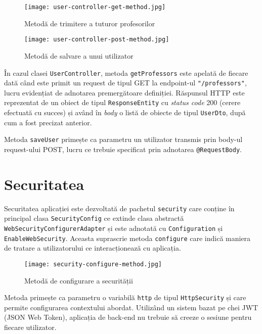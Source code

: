 \begin{figure}[H]
	\centering
	\texttt{[image: user-controller-get-method.jpg]}
	\caption{Metodă de trimitere a tuturor profesorilor}
\end{figure}

\begin{figure}[H]
	\centering
	\texttt{[image: user-controller-post-method.jpg]}
	\caption{Metodă de salvare a unui utilizator}
\end{figure}

În cazul clasei \texttt{UserController}, metoda \texttt{getProfessors} este apelată de fiecare dată când este primit un request de tipul GET la endpoint-ul \texttt{"/professors"}, lucru evidențiat de adnotarea premergătoare definiției. Răspunsul HTTP este reprezentat de un obiect de tipul \texttt{ResponseEntity} cu \textit{status code} 200 (cerere efectuată cu succes) și având în \textit{body} o listă de obiecte de tipul \texttt{UserDto}, după cum a fost precizat anterior.

Metoda \texttt{saveUser} primește ca parametru un utilizator transmis prin body-ul request-ului POST, lucru ce trebuie specificat prin adnotarea \texttt{@RequestBody}.

\section{Securitatea}

Securitatea aplicației este dezvoltată de pachetul \texttt{security} care conține în principal clasa \texttt{SecurityConfig} ce extinde clasa abstractă \texttt{WebSecurityConfigurerAdapter} și este adnotată cu \texttt{Configuration} și \texttt{EnableWebSecurity}. Aceasta suprascrie metoda \texttt{configure} care indică maniera de tratare a utilizatorului ce interacționează cu aplicația.

\begin{figure}[H]
	\centering
	\texttt{[image: security-configure-method.jpg]}
	\caption{Metodă de configurare a securității}
\end{figure}

Metoda primește ca parametru o variabilă \texttt{http} de tipul \texttt{HttpSecurity} și care permite configurarea contextului abordat. Utilizând un sistem bazat pe chei JWT (JSON Web Token), aplicația de back-end nu trebuie să creeze o sesiune pentru fiecare utilizator.

